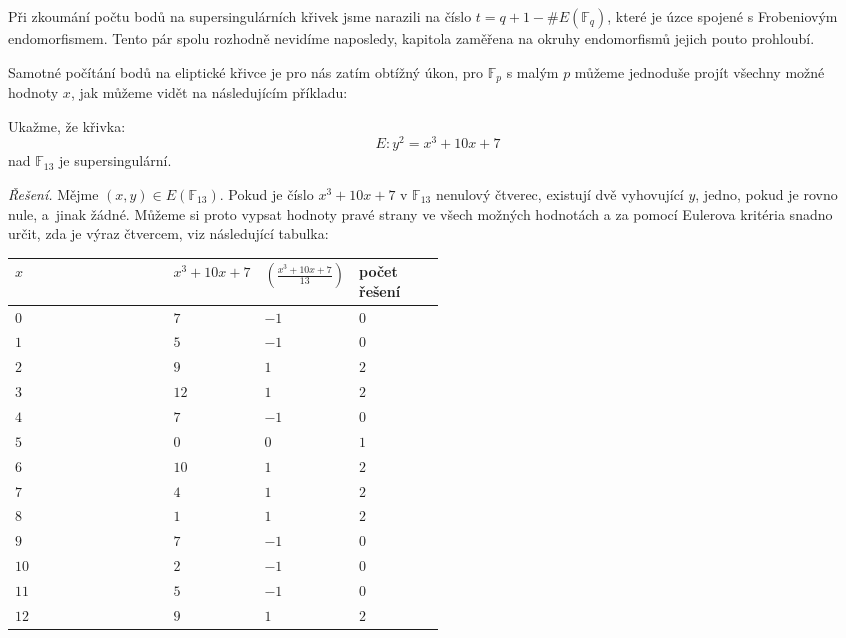 \documentclass[12pt]{report}
\begin{document}
Při zkoumání počtu bodů na supersingulárních křivek jsme narazili na číslo $t = q+1 - \# E(\mathbb{F}_q)$, které je úzce spojené s Frobeniovým endomorfismem. Tento pár spolu rozhodně nevidíme naposledy, kapitola zaměřena na okruhy endomorfismů jejich pouto prohloubí.

Samotné počítání bodů na eliptické křivce je pro nás zatím obtížný úkon, pro $\mathbb{F}_p$ s malým $p$ můžeme jednoduše projít všechny možné hodnoty $x$, jak můžeme vidět na následujícím příkladu:
\begin{priklad}
Ukažme, že křivka:
$$E: y^2 = x^3+10x+7$$
nad $\mathbb{F}_{13}$ je supersingulární.
\end{priklad}
\noindent \textit{Řešení.} Mějme $(x,y) \in E(\mathbb{F}_{13})$. Pokud je číslo $x^3+10x+7$ v $\mathbb{F}_{13}$ nenulový čtverec, existují dvě vyhovující $y$, jedno, pokud je rovno nule, a~jinak žádné. Můžeme si proto vypsat hodnoty pravé strany ve všech možných hodnotách a za pomocí Eulerova kritéria snadno určit, zda je výraz čtvercem, viz následující tabulka:

\begin{longtable}[H]{l>{\centering}p{0.2\linewidth}>{\raggedleft}p{0.1\linewidth}>{\centering\arraybackslash}p{0.2\linewidth}}
\toprule
$x$ & $x^3+10x+7$ & $\genfrac{(}{)}{}{}{x^3+10x+7}{13}$ & počet řešení\\
\midrule
$0$ & $7$  & $-1\quad\;$  & $0$\\
$1$ & $5$  & $-1\quad\;$  & $0$\\
$2$ & $9$  & $1\quad\;$  & $2$\\
$3$ & $12$  & $1\quad\;$  & $2$\\
$4$ & $7$  & $-1\quad\;$  & $0$\\
$5$ & $0$  & $0\quad\;$  & $1$\\
$6$ & $10$  & $1\quad\;$  & $2$\\
$7$ & $4$  & $1\quad\;$  & $2$\\
$8$ & $1$  & $1\quad\;$  & $2$\\
$9$ & $7$  & $-1\quad\;$  & $0$\\
$10$ & $2$  & $-1\quad\;$  & $0$\\
$11$ & $5$  & $-1\quad\;$  & $0$\\
$12$ & $9$  & $1\quad\;$  & $2$\\
\bottomrule 
\end{longtable}
\end{document}
